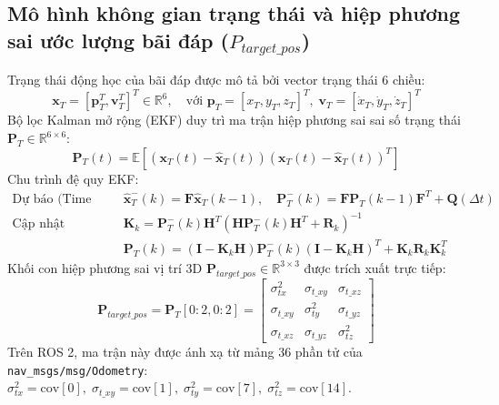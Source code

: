 \documentclass[12pt,a4paper]{article}
\begin{document}
\subsection{Mô hình không gian trạng thái và hiệp phương sai ước lượng bãi đáp ($P_{target\_pos}$)}
Trạng thái động học của bãi đáp được mô tả bởi vector trạng thái 6 chiều:
\begin{equation}
    \mathbf{x}_T = [\mathbf{p}_T^T, \mathbf{v}_T^T]^T \in \mathbb{R}^6, \quad \text{với } \mathbf{p}_T = [x_T, y_T, z_T]^T, \; \mathbf{v}_T = [\dot{x}_T, \dot{y}_T, \dot{z}_T]^T
\end{equation}
Bộ lọc Kalman mở rộng (EKF) duy trì ma trận hiệp phương sai sai số trạng thái $\mathbf{P}_T \in \mathbb{R}^{6 \times 6}$:
\begin{equation}
    \mathbf{P}_T(t) = \mathbb{E}\left[(\mathbf{x}_T(t) - \hat{\mathbf{x}}_T(t))(\mathbf{x}_T(t) - \hat{\mathbf{x}}_T(t))^T\right]
\end{equation}
Chu trình đệ quy EKF:
\begin{align}
    \text{Dự báo (Time Update):} \quad &\hat{\mathbf{x}}_T^-(k) = \mathbf{F} \hat{\mathbf{x}}_T(k-1), \quad \mathbf{P}_T^-(k) = \mathbf{F} \mathbf{P}_T(k-1) \mathbf{F}^T + \mathbf{Q}(\Delta t) \\
    \text{Cập nhật (Measurement):} \quad &\mathbf{K}_k = \mathbf{P}_T^-(k) \mathbf{H}^T \left(\mathbf{H} \mathbf{P}_T^-(k) \mathbf{H}^T + \mathbf{R}_k\right)^{-1} \\
    &\mathbf{P}_T(k) = (\mathbf{I} - \mathbf{K}_k \mathbf{H}) \mathbf{P}_T^-(k) (\mathbf{I} - \mathbf{K}_k \mathbf{H})^T + \mathbf{K}_k \mathbf{R}_k \mathbf{K}_k^T
\end{align}
Khối con hiệp phương sai vị trí 3D $\mathbf{P}_{target\_pos} \in \mathbb{R}^{3 \times 3}$ được trích xuất trực tiếp:
\begin{equation}
    \mathbf{P}_{target\_pos} = \mathbf{P}_T[0:2, 0:2] = \begin{bmatrix}
        \sigma_{tx}^2 & \sigma_{t\_xy} & \sigma_{t\_xz} \\
        \sigma_{t\_xy} & \sigma_{ty}^2 & \sigma_{t\_yz} \\
        \sigma_{t\_xz} & \sigma_{t\_yz} & \sigma_{tz}^2
    \end{bmatrix}
\end{equation}
Trên ROS 2, ma trận này được ánh xạ từ mảng 36 phần tử của \texttt{nav\_msgs/msg/Odometry}:
$\sigma_{tx}^2 = \text{cov}[0], \; \sigma_{t\_xy} = \text{cov}[1], \; \sigma_{ty}^2 = \text{cov}[7], \; \sigma_{tz}^2 = \text{cov}[14]$.
\end{document}
